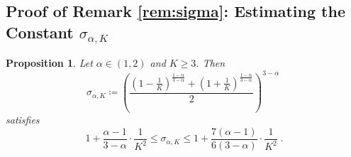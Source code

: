 \documentclass[11pt,oneside,a4paper]{article}
\newcommand{\lrb}[1]{\left(#1\right)}
\theoremstyle{plain}
\newtheorem{proposition}[theorem]{Proposition}
\theoremstyle{definition}
\theoremstyle{remark}
\begin{document}
\subsection[Proof of Remark Sigma: Estimating the Constant sigma(alpha,K)]{Proof of Remark \ref{rem:sigma}: Estimating the Constant $\sigma_{\alpha,K}$}\label{app:sigma}
\begin{proposition}\label{prop:sigma}
Let $\alpha \in (1,2)$ and $K \geq 3$.
Then
 \[
     \sigma_{\alpha, K}
\coloneq
    \lrb{  \frac{ (1-\frac{1}{K})^{\frac{1 - \alpha}{3- \alpha}} + (1+\frac{1}{K})^{\frac{1 - \alpha}{3- \alpha}} }{2} }^{3 - \alpha}\;
\]
satisfies
\begin{equation}\label{eq:sigma-bounds}    
    1 + \frac{\alpha - 1}{3- \alpha} \cdot 
        \frac{1}{K^2} 
\le
    \sigma_{\alpha, K}
\le
    1 + \frac{7(\alpha - 1)}{6(3- \alpha)} \cdot 
        \frac{1}{K^2}\;.
\end{equation}
\end{proposition}
\end{document}
